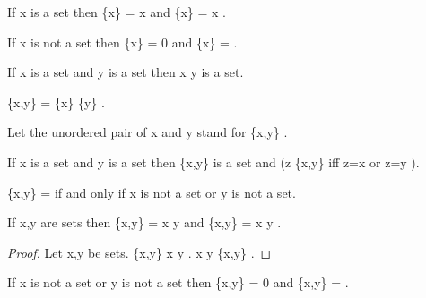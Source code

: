 \documentclass[a4paper,draft]{amsproc}
\begin{document}
\begin{forthel}
\begin{theorem}
If  x  is a set then  \bigcap \{x\} = x  
and  \bigcup \{x\} = x .
\end{theorem}

\begin{theorem}
If  x  is not a set then  \bigcap \{x\} = 0 
and  \bigcup \{x\} =  .
\end{theorem}

\begin{axiom}
If  x  is a set and  y  is a set then  x \cup y  is a set.
\end{axiom}

\begin{definition}  \{x,y\} = \{x\} \cup \{y\} .\end{definition}
Let the unordered pair of  x  and  y  stand for  \{x,y\} .


\begin{theorem}
If  x  is a set and  y  is a set 
then  \{x,y\}  is a set and  (z \in \{x,y\}  iff  z=x  or  z=y ). 
\end{theorem}

\begin{theorem}
 \{x,y\} =   if and only if  x  is not a set or  y  is not a set.
\end{theorem}

\begin{theorem}
If  x,y  are sets then  \bigcap \{x,y\} = x \cap y 
and  \bigcup \{x,y\} = x \cup y .
\end{theorem}
\begin{proof}
Let  x,y  be sets.
 \bigcup \{x,y\} \subset x \cup y .
 x \cup y \subset \bigcup \{x,y\} .
\end{proof}

\begin{theorem}
If  x  is not a set or  y  is not a set then
 \bigcap \{x,y\} = 0  and  \bigcup \{x,y\} =  .
\end{theorem}



\end{forthel}
\end{document}
